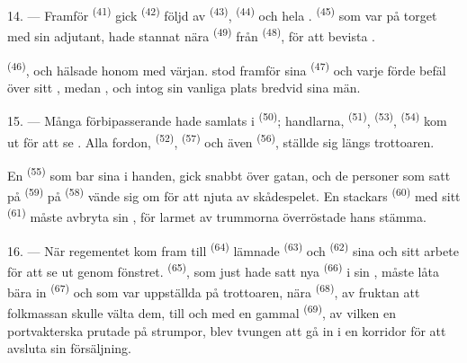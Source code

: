 \VUsaut{3.0mm}

14. --- Framför  \textsuperscript{(41)} gick
 \textsuperscript{(42)} följd av 
\textsuperscript{(43)},  \textsuperscript{(44)} och hela
.  \textsuperscript{(45)} som var på torget
med sin adjutant, hade stannat nära  \textsuperscript{(49)} från
 \textsuperscript{(48)}, för att bevista .

 \textsuperscript{(46)},  och
 hälsade honom med värjan.  stod
framför sina  \textsuperscript{(47)} och varje
 förde befäl över sitt , medan
,  och 
intog sin vanliga plats bredvid sina män.

15. --- Många förbipasserande hade samlats i  \textsuperscript{(50)};
handlarna,  \textsuperscript{(51)}, 
\textsuperscript{(53)},
 \textsuperscript{(54)} kom ut för att se
. Alla fordon,  \textsuperscript{(52)},
 \textsuperscript{(57)} och även 
\textsuperscript{(56)}, ställde sig längs trottoaren.

\VUsaut{3.0mm}

En  \textsuperscript{(55)} som bar sina
 i handen, gick snabbt över gatan, och de personer som satt
på  \textsuperscript{(59)} på  \textsuperscript{(58)}
vände sig om för att njuta av skådespelet. En stackars
 \textsuperscript{(60)} med sitt 
\textsuperscript{(61)} måste avbryta sin , för larmet av trummorna överröstade
hans stämma.

16. --- När regementet kom fram till  \textsuperscript{(64)} lämnade
 \textsuperscript{(63)} och
 \textsuperscript{(62)} sina  och sitt
arbete för att se ut genom fönstret.  \textsuperscript{(65)}, som just hade
satt nya  \textsuperscript{(66)} i sin , måste låta bära in
 \textsuperscript{(67)} och  som var
uppställda på trottoaren, nära  \textsuperscript{(68)}, av fruktan att
folkmassan skulle välta dem, till och med en gammal
 \textsuperscript{(69)}, av vilken en portvakterska
prutade på strumpor, blev tvungen att gå in i en korridor för att avsluta sin försäljning.

